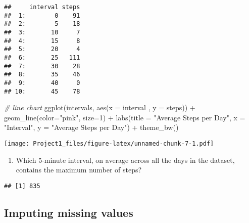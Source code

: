 \documentclass[
]{article}
\newenvironment{Shaded}{\begin{snugshade}}{\end{snugshade}}
\newcommand{\AttributeTok}[1]{\textcolor[rgb]{0.77,0.63,0.00}{#1}}
\newcommand{\CommentTok}[1]{\textcolor[rgb]{0.56,0.35,0.01}{\textit{#1}}}
\newcommand{\DecValTok}[1]{\textcolor[rgb]{0.00,0.00,0.81}{#1}}
\newcommand{\FunctionTok}[1]{\textcolor[rgb]{0.00,0.00,0.00}{#1}}
\newcommand{\NormalTok}[1]{#1}
\newcommand{\SpecialCharTok}[1]{\textcolor[rgb]{0.00,0.00,0.00}{#1}}
\newcommand{\StringTok}[1]{\textcolor[rgb]{0.31,0.60,0.02}{#1}}
\providecommand{\tightlist}{%
  \setlength{\itemsep}{0pt}\setlength{\parskip}{0pt}}
\begin{document}
\begin{verbatim}
##     interval steps
##  1:        0    91
##  2:        5    18
##  3:       10     7
##  4:       15     8
##  5:       20     4
##  6:       25   111
##  7:       30    28
##  8:       35    46
##  9:       40     0
## 10:       45    78
\end{verbatim}

\begin{Shaded}
\begin{Highlighting}[]
\CommentTok{\# line chart}
\FunctionTok{ggplot}\NormalTok{(intervals, }\FunctionTok{aes}\NormalTok{(}\AttributeTok{x =}\NormalTok{ interval , }\AttributeTok{y =}\NormalTok{ steps)) }\SpecialCharTok{+} 
  \FunctionTok{geom\_line}\NormalTok{(}\AttributeTok{color=}\StringTok{"pink"}\NormalTok{, }\AttributeTok{size=}\DecValTok{1}\NormalTok{) }\SpecialCharTok{+} 
  \FunctionTok{labs}\NormalTok{(}\AttributeTok{title =} \StringTok{"Average Steps per Day"}\NormalTok{, }\AttributeTok{x =} \StringTok{"Interval"}\NormalTok{, }\AttributeTok{y =} \StringTok{"Average Steps per Day"}\NormalTok{) }\SpecialCharTok{+} 
  \FunctionTok{theme\_bw}\NormalTok{()}
\end{Highlighting}
\end{Shaded}

\texttt{[image: Project1\_files/figure-latex/unnamed-chunk-7-1.pdf]}

\begin{enumerate}
\def\labelenumi{\arabic{enumi}.}
\setcounter{enumi}{1}
\tightlist
\item
  Which 5-minute interval, on average across all the days in the
  dataset, contains the maximum number of steps?
\end{enumerate}

\begin{Shaded}
\end{Shaded}

\begin{verbatim}
## [1] 835
\end{verbatim}

\hypertarget{imputing-missing-values}{%
\subsection{Imputing missing values}\label{imputing-missing-values}}
\end{document}
